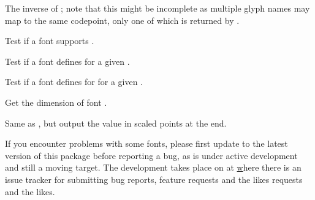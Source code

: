             The inverse of ; note that this
            might be incomplete as multiple glyph names may map to the
            same codepoint, only one of which is returned by
            .

            Test if a font supports .

            Test if a font defines  for a given
            .

            Test if a font defines  for
             for a given .

            Get the dimension  of font .

            Same as , but output the value
            in scaled points at the \TEX end.

\endfunctionlist

\endsubsubsection

%
%
%

\endsubsection
\endsection



If you encounter problems with some fonts, please first update to the
latest version of this package before reporting a bug, as
 is under active development and still a moving
target.
%
The development takes place on  at
\hyperlink {https://github.com/lualatex/luaotfload} where there is an issue
tracker for submitting bug reports, feature requests and the likes
requests and the likes.

